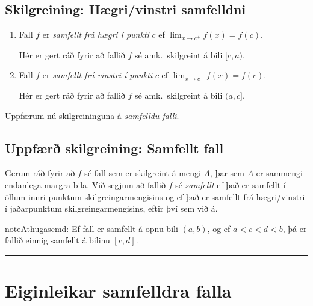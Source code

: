 \documentclass[a4paper,10pt,icelandic]{sphinxmanual}
\begin{document}
\subsection{Skilgreining: Hægri/vinstri samfelldni}
\label{kafli02:skilgreining-haegri-vinstri-samfelldni}\begin{enumerate}
\item {} 
Fall \(f\) er \emph{samfellt frá hægri í punkti} \(c\) ef
\(\lim_{x\rightarrow c^+}f(x)=f(c)\).

Hér er gert ráð fyrir að fallið \(f\) sé amk. skilgreint á
bili \([c, a)\).

\item {} 
Fall \(f\) er \emph{samfellt frá vinstri í punkti} \(c\) ef
\(\lim_{x\rightarrow c^-}f(x)=f(c)\).

Hér er gert ráð fyrir að fallið \(f\) sé amk. skilgreint á
bili \((a, c]\).

\end{enumerate}

Uppfærum nú skilgreininguna á {\hyperref[kafli02:skilgrsamfellt]{\emph{samfelldu falli}}}.


\subsection{Uppfærð skilgreining: Samfellt fall}
\label{kafli02:uppfaer-skilgreining-samfellt-fall}\label{kafli02:index-11}
Gerum ráð fyrir að \(f\) sé fall sem er skilgreint á mengi
\(A\), þar sem \(A\) er sammengi endanlega margra bila. Við
segjum að fallið \(f\) sé \emph{samfellt} ef það er samfellt í öllum
innri punktum skilgreingarmengisins og ef það er samfellt frá
hægri/vinstri í jaðarpunktum skilgreingarmengisins, eftir því sem við á.

\begin{notice}{note}{Athugasemd:}
Ef fall er samfellt á opnu bili \((a,b)\), og ef \(a<c<d<b\), þá
er fallið einnig samfellt á bilinu \([c,d]\).
\end{notice}


\bigskip\hrule{}\bigskip



\section{Eiginleikar samfelldra falla}
\label{kafli02:eiginleikar-samfelldra-falla}
\end{document}
